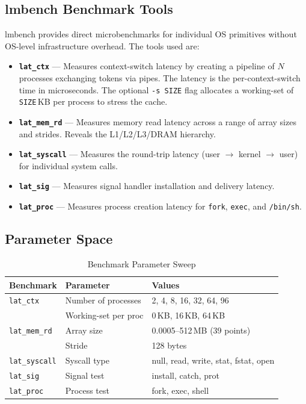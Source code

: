 \documentclass[12pt,a4paper]{article}
\begin{document}
\subsection{lmbench Benchmark Tools}

lmbench provides direct microbenchmarks for individual OS primitives
without OS-level infrastructure overhead. The tools used are:

\begin{itemize}
    \item \textbf{\texttt{lat\_ctx}} — Measures context-switch latency by
    creating a pipeline of $N$ processes exchanging tokens via pipes. The
    latency is the per-context-switch time in microseconds. The optional
    \texttt{-s SIZE} flag allocates a working-set of \texttt{SIZE}\,KB per
    process to stress the cache.
    \item \textbf{\texttt{lat\_mem\_rd}} — Measures memory read latency across
    a range of array sizes and strides. Reveals the L1/L2/L3/DRAM hierarchy.
    \item \textbf{\texttt{lat\_syscall}} — Measures the round-trip latency
    (user $\to$ kernel $\to$ user) for individual system calls.
    \item \textbf{\texttt{lat\_sig}} — Measures signal handler installation and
    delivery latency.
    \item \textbf{\texttt{lat\_proc}} — Measures process creation latency for
    \texttt{fork}, \texttt{exec}, and \texttt{/bin/sh}.
\end{itemize}

\subsection{Parameter Space}

\begin{table}[H]
\centering
\caption{Benchmark Parameter Sweep}
\label{tab:params}
\begin{tabular}{lll}
\toprule
\textbf{Benchmark} & \textbf{Parameter} & \textbf{Values} \\
\midrule
\texttt{lat\_ctx} & Number of processes  & 2, 4, 8, 16, 32, 64, 96 \\
                  & Working-set per proc & 0\,KB, 16\,KB, 64\,KB \\
\texttt{lat\_mem\_rd} & Array size & 0.0005--512\,MB (39 points) \\
                      & Stride & 128 bytes \\
\texttt{lat\_syscall} & Syscall type & null, read, write, stat, fstat, open \\
\texttt{lat\_sig} & Signal test & install, catch, prot \\
\texttt{lat\_proc} & Process test & fork, exec, shell \\
\bottomrule
\end{tabular}
\end{table}
\end{document}
